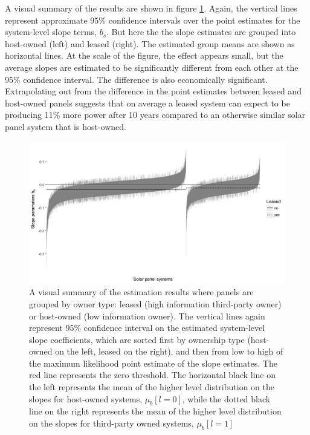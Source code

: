 \documentclass[a4paper]{article}
\begin{document}
A visual summary of the results are shown in figure \ref{lease_sys_fig}. Again, the vertical lines represent approximate 95\% confidence intervals over the point estimates for the system-level slope terms, $b_s$. But here the the slope estimates are grouped into host-owned (left) and leased (right). The estimated group means are shown as horizontal lines. At the scale of the figure, the effect appears small, but the average slopes are estimated to be significantly different from each other at the 95\% confidence interval. The difference is also economically significant. Extrapolating out from the difference in the point estimates between leased and host-owned panels suggests that on average a leased system can expect to be producing 11\% more power after 10 years compared to an otherwise similar solar panel system that is host-owned.

\begin{figure}
  \centering
	\includegraphics[width=1\textwidth]{figures/lease_sys_fig.png}
	\caption{A visual summary of the estimation results where panels are grouped by owner type: leased (high information third-party owner) or host-owned (low information owner). The vertical lines again represent 95\% confidence interval on the estimated system-level slope coefficients, which are sorted first by ownership type (host-owned on the left, leased on the right), and then from low to high of the maximum likelihood point estimate of the slope estimates. The red line represents the zero threshold. The horizontal black line on the left represents the mean of the higher level distribution on the slopes for host-owned systems, $\mu_b[l=0]$, while the dotted black line on the right represents the mean of the higher level distribution on the slopes for third-party owned systems, $\mu_b[l=1]$ }
	\label{lease_sys_fig}
\end{figure}
\end{document}
